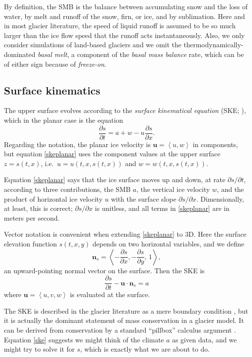 \documentclass[letterpaper,final,12pt,reqno]{amsart}
\newcommand{\bn}{\mathbf{n}}
\newcommand{\bu}{\mathbf{u}}
\begin{document}
By definition, the SMB is the balance between accumulating snow and the loss of water, by melt and runoff of the snow, firn, or ice, and by sublimation.  Here and in most glacier literature, the speed of liquid runoff is assumed to be so much larger than the ice flow speed that the runoff acts instantaneously.  Also, we only consider simulations of land-based glaciers and we omit the thermodynamically-dominated \emph{basal melt}, a component of the \emph{basal mass balance} rate, which can be of either sign because of \emph{freeze-on}.

\subsection*{Surface kinematics}  The upper surface evolves according to the \emph{surface kinematical equation} (SKE; \cite{SchoofHewitt2013}), which in the planar case is the equation
\begin{equation}
\frac{\partial s}{\partial t} = a + w -u \frac{\partial s}{\partial x}. \label{skeplanar}
\end{equation}
Regarding the notation, the planar ice velocity is $\bu=\left<u,w\right>$ in components, but equation \eqref{skeplanar} uses the component values at the upper surface $z=s(t,x)$, i.e.~$u=u(t,x,s(t,x))$ and $w=w(t,x,s(t,x))$.

Equation \eqref{skeplanar} says that the ice surface moves up and down, at rate $\partial s/\partial t$, according to three contributions, the SMB $a$, the vertical ice velocity $w$, and the product of horizontal ice velocity $u$ with the surface slope $\partial s/\partial x$.  Dimensionally, at least, this is correct; $\partial s/\partial x$ is unitless, and all terms in \eqref{skeplanar} are in meters per second.

Vector notation is convenient when extending \eqref{skeplanar} to 3D.  Here the surface elevation function $s(t,x,y)$ depends on two horizontal variables, and we define
\begin{equation}
\bn_s = \left<-\frac{\partial s}{\partial x}, -\frac{\partial s}{\partial y}, \,1\right>, \label{normal}
\end{equation}
an upward-pointing normal vector on the surface.  Then the SKE is
\begin{equation}
\frac{\partial s}{\partial t} - \bu \cdot \bn_s = a  \label{ske}
\end{equation}
where $\bu=\left<u,v,w\right>$ is evaluated at the surface.

The SKE is described in the glacier literature as a mere boundary condition \cite{GreveBlatter2009,SchoofHewitt2013}, but it is actually the dominant statement of mass conservation in a glacier model.  It can be derived from conservation by a standard ``pillbox'' calculus argument \cite{Aschwandenetal2012}.  Equation \eqref{ske} suggests we might think of the climate $a$ as given data, and we might try to solve it for $s$, which is exactly what we are about to do.
\end{document}
